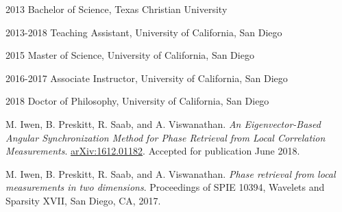 \documentclass[12pt]{ucsd-thesis}
\begin{document}
\begin{frontmatter}
\tableofcontents

\listoffigures

\listoftables

\begin{acknowledgements}

\end{acknowledgements}

\begin{vitapage}
\begin{vita}
\item[2013] Bachelor of Science, Texas Christian University
\item[2013-2018] Teaching Assistant, University of California, San Diego
\item[2015] Master of Science, University of California, San Diego
\item[2016-2017] Associate Instructor, University of California, San Diego
\item[2018] Doctor of Philosophy, University of California, San Diego
\end{vita}

\begin{publications}
\item  M. Iwen, B. Preskitt, R. Saab, and A. Viswanathan.  \emph{An Eigenvector-Based Angular Synchronization Method for Phase Retrieval from Local Correlation Measurements}.  \href{https://arxiv.org/abs/1612.01182}{arXiv:1612.01182}.  Accepted for publication June 2018.
  \item M. Iwen, B. Preskitt, R. Saab, and A. Viswanathan.  \emph{Phase retrieval from local measurements in two dimensions}.  Proceedings of SPIE 10394, Wavelets and Sparsity XVII, San Diego, CA, 2017.
\end{publications}


\end{vitapage}
\end{frontmatter}
\end{document}
